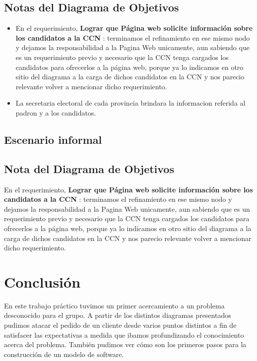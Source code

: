 \documentclass[spanish, 10pt,a4paper]{article}
\numberwithin{equation}{section} %
\begin{document}
\clearpage


\newpage
\subsection{Notas del Diagrama de Objetivos}
\begin{itemize}
	\item En el requerimiento, \textbf{Lograr que Página web solicite información sobre los candidatos a la CCN} : terminamos el refinamiento en ese mismo nodo y dejamos la responsabilidad a la Pagina Web unicamente, aun sabiendo que es un requerimiento previo y necesario que la CCN tenga cargados los candidatos para ofrecerlos a la página web, porque ya lo indicamos en otro sitio del diagrama a la carga de dichos candidatos en la CCN y nos parecio relevante volver a mencionar dicho requerimiento.
\item  La secretaria electoral de cada provincia brindara la informacion referida al padron y a los candidatos.
\end{itemize}
\subsection{Escenario informal}


\subsection{Nota del Diagrama de Objetivos}

	En el requerimiento, \textbf{Lograr que Página web solicite información sobre los candidatos a la CCN} : terminamos el refinamiento en ese mismo nodo y dejamos la responsabilidad a la Pagina Web unicamente, aun sabiendo que es un requerimiento previo y necesario que la CCN tenga cargados los candidatos para ofrecerlos a la página web, porque ya lo indicamos en otro sitio del diagrama a la carga de dichos candidatos en la CCN y nos parecio relevante volver a mencionar dicho requerimiento.

\newpage
\section{Conclusión}
	En este trabajo práctico tuvimos un primer acercamiento a un problema desconocido para el grupo. A partir de los distintos diagramas presentados pudimos atacar el pedido de un cliente desde varios puntos distintos a fin de satisfacer las expectativas a medida que ibamos profundizando el conocimiento acerca del problema. También pudimos ver cómo son los primeros pasos para la construcción de un modelo de software.
	
\end{document}
